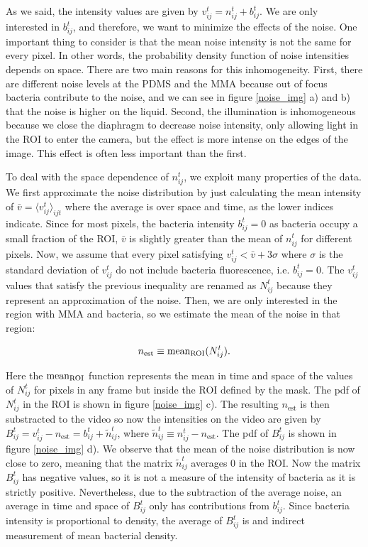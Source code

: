 As we said, the intensity values are given by $v_{ij}^t  = n_{ij}^t +  b_{ij}^t$. We are only interested in $b_{ij}^t$, and therefore, we want to minimize the effects of the noise. One important thing to consider is that the mean noise intensity is not the same for every pixel. In other words, the probability density function of noise intensities depends on space. There are two main reasons for this inhomogeneity. First, there are different noise levels at the PDMS and the MMA because out of focus bacteria contribute to the noise, and we can see in figure \ref{noise_img} a) and b) that the noise is higher on the liquid. Second, the illumination is inhomogeneous because we close the diaphragm to decrease noise intensity, only allowing light in the ROI to enter the camera, but the effect is more intense on the edges of the image. This effect is often less important than the first.

To deal with the space dependence of $n_{ij}^t$, we exploit many properties of the data. We first approximate the noise distribution by just calculating the mean intensity of  $\bar{v} = \langle v_{ij}^t \rangle_{ijt}$ where the average is over space and time, as the lower indices indicate. Since for most pixels, the bacteria intensity $b_{ij}^t=0$ as bacteria occupy a small fraction of the ROI, $\bar{v}$ is slightly greater than the mean of $n_{ij}^t$ for different pixels. Now, we assume that every pixel satisfying $v_{ij}^t  < \bar{v} + 3 \sigma$ where $\sigma$ is the standard deviation of $v_{ij}^t$ do not include bacteria fluorescence, i.e. $b_{ij}^t =0$. The $v_{ij}^t$ values that satisfy the previous inequality are renamed as $N_{ij}^t$ because they represent an approximation of the noise. Then, we are only interested in the region with MMA and bacteria, so we estimate the mean of the noise in that region:

\begin{equation} \label{eq:noise_aproximation}
	n_{\text{est}} \equiv {\rm mean_{ROI}}(N_{ij}^t).
\end{equation}

Here the ${\rm mean_{ROI}}$ function represents the mean in time and space of the values of $N_{ij}^t$ for pixels in any frame but inside the ROI defined by the mask. The pdf of $N_{ij}^t$ in the ROI is shown in figure \ref{noise_img} c). The resulting $n_{\text{est}}$ is then substracted to the video so now the intensities on the video are given by $B_{ij}^t  =  v_{ij}^t - n_{\text{est}} =  b_{ij}^t + \tilde{n}_{ij}^t$, where $\tilde{n}_{ij}^t  \equiv n_{ij}^t - n_{\text{est}}$. The pdf of $B_{ij}^t$ is shown in figure \ref{noise_img} d). We observe that the mean of the noise distribution is now close to zero, meaning that the matrix $\tilde{n}_{ij}^t$ averages 0 in the ROI. Now the matrix $B_{ij}^t$ has negative values, so it is not a measure of the intensity of bacteria as it is strictly positive. Nevertheless, due to the subtraction of the average noise, an average in time and space of $B_{ij}^t$ only has contributions from $b_{ij}^t$. Since bacteria intensity is proportional to density, the average of $B_{ij}^t$ is and indirect measurement of mean bacterial density.


